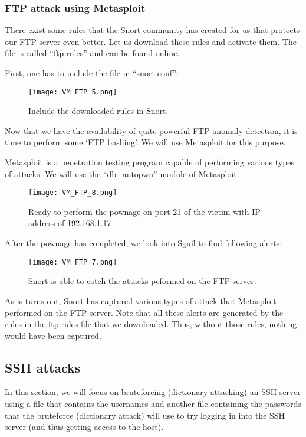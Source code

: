\subsubsection{FTP attack using Metasploit}

There exist some rules that the Snort community has created for us that protects our FTP server even better. Let us download these rules and activate them. The file is called ``ftp.rules'' and can be found online.

First, one has to include the file in ``snort.conf'':
\begin{figure}[h]
    \centering
    \texttt{[image: VM\_FTP\_5.png]}
    \caption{Include the downloaded rules in Snort.}
\end{figure}

Now that we have the availability of quite powerful FTP anomaly detection, it is time to perform some `FTP bashing'. We will use Metasploit for this purpose.

Metasploit is a penetration testing program capable of performing various types of attacks. We will use the ``db\_autopwn'' module of Metasploit.

\begin{figure}[h]
    \centering
    \texttt{[image: VM\_FTP\_8.png]}
    \caption{Ready to perform the pownage on port 21 of the victim with IP address of 192.168.1.17}
\end{figure}
After the pownage has completed, we look into Sguil to find following alerts:
\begin{figure}[h]
    \centering
    \texttt{[image: VM\_FTP\_7.png]}
    \caption{Snort is able to catch the attacks peformed on the FTP server.}
\end{figure}
As is turns out, Snort has captured various types of attack that Metasploit performed on the FTP server. Note that all these alerts are generated by the rules in the ftp.rules file that we downloaded. Thus, without those rules, nothing would have been captured.

\clearpage

\subsection{SSH attacks}

In this section, we will focus on bruteforcing (dictionary attacking) an SSH server using a file that contains the usernames and another file containing the passwords that the bruteforce (dictionary attack) will use to try logging in into the SSH server (and thus getting access to the host).

